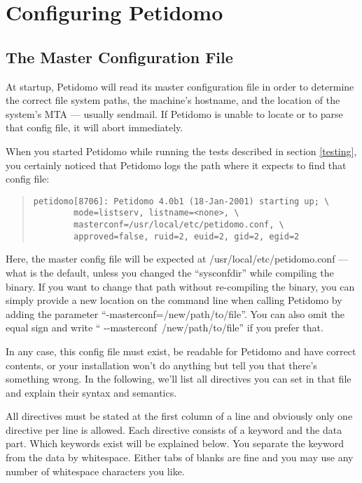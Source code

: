 \documentclass[a4paper,10pt]{scrreprt}
\begin{document}
\chapter{Configuring Petidomo}

\section{The Master Configuration File}

At startup, Petidomo will read its master configuration file in order
to determine the correct file system paths, the machine's hostname,
and the location of the system's MTA --- usually sendmail. If Petidomo
is unable to locate or to parse that config file, it will abort
immediately.

When you started Petidomo while running the tests described in section
\ref{testing}, you certainly noticed that Petidomo logs the path where
it expects to find that config file:
\begin{quote}
\begin{verbatim}
petidomo[8706]: Petidomo 4.0b1 (18-Jan-2001) starting up; \
        mode=listserv, listname=<none>, \
        masterconf=/usr/local/etc/petidomo.conf, \
        approved=false, ruid=2, euid=2, gid=2, egid=2
\end{verbatim}
\end{quote}

Here, the master config file will be expected at {\sf
/usr/local/etc/petidomo.conf} --- what is the default, unless you
changed the ``sysconfdir'' while compiling the binary. If you want to
change that path without re-compiling the binary, you can simply
provide a new location on the command line when calling Petidomo by
adding the parameter ``{\sf {-}-masterconf=/new/path/to/file}''. You
can also omit the equal sign and write ``{\sf
{-}-masterconf~/new/path/to/file}'' if you prefer that.

In any case, this config file must exist, be readable for Petidomo and
have correct contents, or your installation won't do anything but tell
you that there's something wrong. In the following, we'll list all
directives you can set in that file and explain their syntax and
semantics.

\label{config file syntax}
All directives must be stated at the first column of a line and
obviously only one directive per line is allowed. Each directive
consists of a keyword and the data part. Which keywords exist will be
explained below. You separate the keyword from the data by whitespace.
Either tabs of blanks are fine and you may use any number of
whitespace characters you like.
\end{document}
